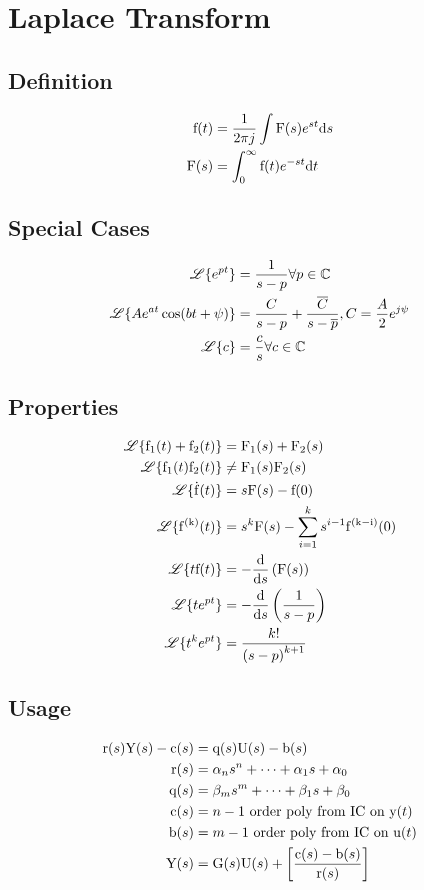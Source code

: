 \section*{Laplace Transform}
\subsection*{Definition}
\begin{align*}
    \func{f}[t] &= \frac{1}{2 \pi j} \intidef{\func{F}[s] e^{st}}[s] \\
    \func{F}[s] &= \intdef{0}{\infty}{\func{f}[t] e^{-st}}{t}
\end{align*}

\subsection*{Special Cases}
\begin{align*}
    \laplace{e^{pt}} &= \frac{1}{s-p} \forall p \in \mathbb{C} \\
    \laplace{Ae^{at}\cos{bt+\psi}} &= \frac{C}{s-p}+\frac{\overline{C}}{s-\overline{p}}, C = \frac{A}{2}e^{j\psi} \\
    \laplace{c} &= \frac{c}{s} \forall c \in \mathbb{C}
\end{align*}

\subsection*{Properties}
\begin{align*}
    \laplace{\func{f_1}[t] + \func{f_2}[t]} &= \func{F_1}[s]+\func{F_2}[s] \\
    \laplace{\func{f_1}[t]\func{f_2}[t]} &\neq \func{F_1}[s]\func{F_2}[s] \\
    \laplace{\func{\dot{f}}[t]} &= s \func{F}[s] - \func{f}[0] \\
    \laplace{\func{f^{(k)}}[t]} &= s^{k} \func{F}[s] - \sum_{i=1}^{k} s^{i-1}\func{f^{(k-i)}}[0] \\
    \laplace{t \func{f}[t]} &= -\deriv{s}{\func{F}[s]} \\
    \laplace{t e^{pt}} &= -\deriv{s}{\frac{1}{s-p}} \\
    \laplace{t^{k} e^{pt}} &= \frac{k!}{{(s-p)}^{k+1}}
\end{align*}

\subsection*{Usage}
\begin{align*}
    \func{r}[s]\func{Y}[s]-\func{c}[s] &= \func{q}[s]\func{U}[s]-\func{b}[s] \\
    \func{r}[s] &= \alpha_n s^n + \cdots + \alpha_1 s + \alpha_0 \\
    \func{q}[s] &= \beta_m s^m + \cdots + \beta_1 s + \beta_0 \\
    \func{c}[s] &= n-1 \text{ order poly from IC on } \func{y}[t] \\
    \func{b}[s] &= m-1 \text{ order poly from IC on } \func{u}[t] \\
    \func{Y}[s] &= \func{G}[s]\func{U}[s]+\left[\frac{\func{c}[s]-\func{b}[s]}{\func{r}[s]}\right]
\end{align*}